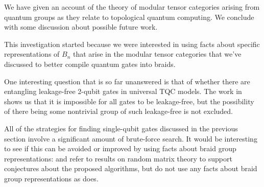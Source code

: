 We have given an account of the theory of modular tensor categories arising
from quantum groups as they relate to topological quantum computing. We
conclude with some discussion about possible future work. 

This investigation started because we were interested in using facts about
specific representations of $B_n$ that arise in the modular tensor categories
that we've discussed to better compile quantum gates into braids.
       
One interesting question that is so far unanswered is that of whether there are
entangling leakage-free 2-qubit gates in universal TQC models. The work in
\cite{Ainsworth2011} shows us that it is impossible for all gates to be
leakage-free, but the possibility of there being some nontrivial group of such
leakage-free is not excluded. 

All of the strategies for finding single-qubit gates discussed in the previous
section involve a significant amount of brute-force search. It would be
interesting to see if this can be avoided or improved by using facts about
braid group representations: \cite{Burrello2011} and \cite{Burrello2010} refer
to results on random matrix theory to support conjectures about the proposed
algorithms, but do not use any facts about braid group representations as
\cite{Ainsworth2011} does.
